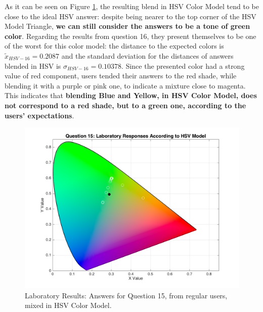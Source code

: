 \begin{enumerate}
  As it can be seen on Figure \ref{fig:labhsvregular_15}, the resulting blend in HSV Color Model tend to be close to the ideal HSV answer: despite being nearer to the top corner of the HSV Model Triangle, \textbf{we can still
  consider the answers to be a tone of green color}. Regarding the results from question 16, they present themselves to be one of the worst for this color model: the distance to the expected colors is $\tilde{x}_{HSV-16} = 0.2087$
  and the standard deviation for the distances of answers blended in HSV is $\sigma_{HSV-16} = 0.10378$. Since the presented color had a strong value of red component, users tended their answers to the red shade, while blending
  it with a purple or pink one, to indicate a mixture close to magenta. This indicates that \textbf{blending Blue and Yellow, in HSV Color Model, does not correspond to a red shade, but to a green one, according to
  the users' expectations}.
  \begin{figure}[!htbp]
    \centering
    \begin{minipage}{0.48\textwidth}
      \centering
      \includegraphics[width=\textwidth]{images/15_lab_HSVresponses.png}
      \caption[Laboratory Results: Answers for Question 15, from regular users, mixed in HSV Color Model.]{Laboratory Results: Answers for Question 15, from regular users, mixed in HSV Color Model.}
      \label{fig:labhsvregular_15}
    \end{minipage}\hfill
    \begin{minipage}{0.48\textwidth}
      \centering

\end{minipage}
\end{figure}
\end{enumerate}
